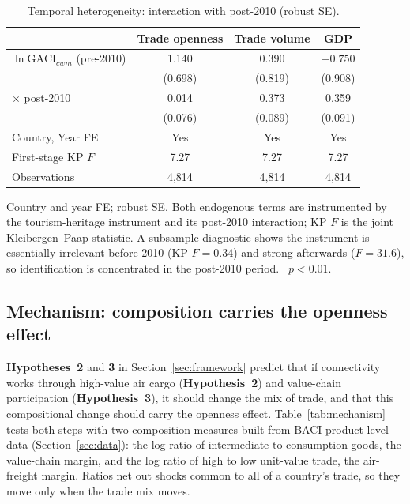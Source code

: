 \begin{table}[H]
\centering
\caption{Temporal heterogeneity: interaction with post-2010 (robust SE).}
\label{tab:temporal}
\begin{threeparttable}
\small
\begin{tabular}{lccc}
\toprule
 & Trade openness & Trade volume & GDP \\
\midrule
$\ln\mathrm{GACI}_{cwm}$ (pre-2010) & 1.140   & 0.390   & $-0.750$ \\
                                                & (0.698) & (0.819) & (0.908) \\
$\times$ post-2010      & 0.014   & 0.373\sym{***} & 0.359\sym{***} \\
                                                & (0.076) & (0.089) & (0.091) \\
\midrule
Country, Year FE        & Yes & Yes & Yes \\
First-stage KP $F$      & 7.27 & 7.27 & 7.27 \\
Observations & 4{,}814 & 4{,}814 & 4{,}814 \\
\bottomrule
\end{tabular}
\begin{tablenotes}\small
\item Country and year FE; robust SE. Both endogenous terms are instrumented
by the tourism-heritage instrument and its post-2010 interaction; KP $F$ is
the joint Kleibergen--Paap statistic. A subsample diagnostic shows the
instrument is essentially irrelevant before 2010 (KP $F=0.34$) and strong afterwards ($F=31.6$), so identification is concentrated in the post-2010
period.
\sym{***}~$p<0.01$.
\end{tablenotes}
\end{threeparttable}
\end{table}

\subsection{Mechanism: composition carries the openness effect}
\label{sec:mechanism}
\label{sec:mediation}
\textbf{Hypotheses~2} and \textbf{3} in Section~\ref{sec:framework} predict that if
connectivity works through high-value air cargo (\textbf{Hypothesis~2}) and
value-chain participation (\textbf{Hypothesis~3}), it should change the mix of trade,
and that this compositional change should carry the openness effect.
Table~\ref{tab:mechanism} tests both steps with two composition measures
built from BACI product-level data (Section~\ref{sec:data}): the log
ratio of intermediate to consumption goods, the value-chain margin, and
the log ratio of high to low unit-value trade, the air-freight margin.
Ratios net out shocks common to all of a country's trade, so they move
only when the trade mix moves.

